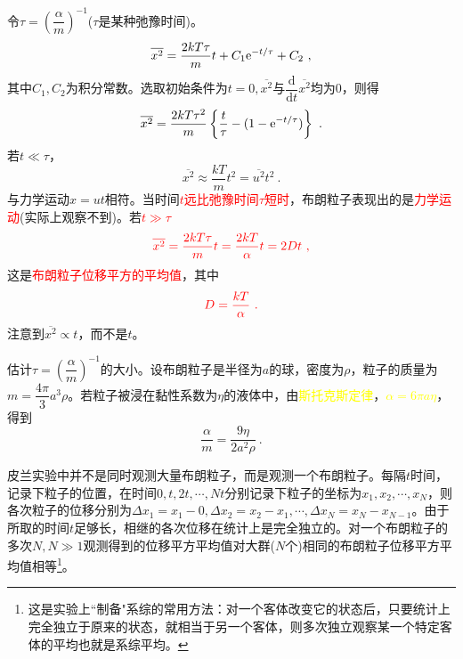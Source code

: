 \documentclass[11pt,a4paper]{article}
\newcommand{\dif}{\mathrm{d}}
\begin{document}
令$\tau = \left(\dfrac{\alpha}{m} \right)^{-1}$($\tau$是某种弛豫时间)。
\begin{equation}
\overline{x^2} =  \dfrac{2kT\tau}{m} t +C_1 {\rm e}^{-t/\tau} +C_2 ~,
\end{equation}
其中$C_1, C_2$为积分常数。选取初始条件为$t=0, \overline{x^2}$与$\dfrac{\dif }{\dif t} \overline{x^2}$均为$0$，则得
\begin{equation}
\overline{x^2} = \dfrac{2k T\tau^2}{m} \left\{\dfrac{t}{\tau} -(1 - {\rm e}^{-t/\tau}) \right\} ~.
\end{equation}
若$t \ll \tau$，
\begin{equation}
\overline{x^2} \approx \dfrac{kT}{m} t^2 = \overline{u^2} t^2 ~.
\end{equation}
与力学运动$x=ut$相符。当时间\textcolor{red}{$t$远比弛豫时间$\tau$短时}，布朗粒子表现出的是\textcolor{red}{力学运动}(实际上观察不到)。若\textcolor{red}{$t \gg \tau$}
\begin{equation}
\color{red} \overline{x^2} = \dfrac{2kT \tau}{m} t = \dfrac{2kT}{\alpha} t  = 2Dt ~,
\end{equation}
这是\textcolor{red}{布朗粒子位移平方的平均值}，其中
\begin{equation}
\color{red} D = \dfrac{kT}{\alpha} ~.
\end{equation}
注意到$\overline{x^2} \propto t$，而不是$t$。

估计$\tau = \left(\dfrac{\alpha}{m} \right)^{-1}$的大小。设布朗粒子是半径为$a$的球，密度为$\rho$，粒子的质量为$m = \dfrac{4\pi}{3} a^3 \rho$。若粒子被浸在黏性系数为$\eta$的液体中，由\textcolor{yellow}{斯托克斯定律}，\textcolor{yellow}{$\alpha = 6 \pi a \eta$}，得到
\begin{equation}
\dfrac{\alpha}{m} = \dfrac{9\eta}{2a^2 \rho} ~.
\end{equation}

皮兰实验中并不是同时观测大量布朗粒子，而是观测一个布朗粒子。每隔$t$时间，记录下粒子的位置，在时间$0, t, 2t, \cdots, Nt$分别记录下粒子的坐标为$x_1, x_2, \cdots, x_N$，则各次粒子的位移分别为$\Delta x_1 = x_1 -0, \Delta x_2 = x_2 -x_1, \cdots, \Delta x_N = x_N -x_{N-1}$。由于所取的时间$t$足够长，相继的各次位移在统计上是完全独立的。对一个布朗粒子的多次$N, N \gg 1$观测得到的位移平方平均值对大群($N$个)相同的布朗粒子位移平方平均值相等\footnote{这是实验上``制备"系综的常用方法：对一个客体改变它的状态后，只要统计上完全独立于原来的状态，就相当于另一个客体，则多次独立观察某一个特定客体的平均也就是系综平均。}。
\end{document}
